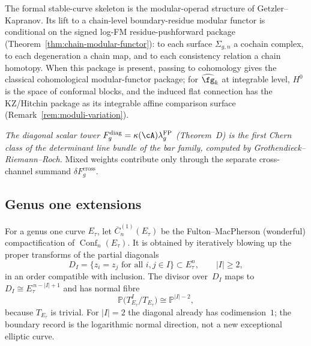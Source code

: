 The formal stable-curve skeleton is the modular-operad structure of
Getzler--Kapranov.  Its lift to a chain-level boundary-residue modular
functor is conditional on the signed log-FM residue-pushforward package
(Theorem~\ref{thm:chain-modular-functor}): to each surface
$\Sigma_{g,n}$ a cochain complex, to each degeneration a chain map, and
to each consistency relation a chain homotopy. When this package is
present, passing to cohomology gives the classical cohomological
modular-functor package; for $\widehat{\fg}_k$ at integrable level,
$H^0$ is the space of conformal blocks, and the induced flat
connection has the KZ/Hitchin package as its integrable affine
comparison surface
(Remark~\ref{rem:moduli-variation}).

\emph{The diagonal scalar tower
$F_g^{\mathrm{diag}} = \kappa(\cA)\lambda_g^{\mathrm{FP}}$
\textup{(}Theorem~D\textup{)}
is the first Chern class of the determinant line bundle of the
bar family, computed by Grothendieck--Riemann--Roch.}  Mixed
weights contribute only through the separate cross-channel summand
$\delta F_g^{\mathrm{cross}}$.

\subsection{Genus one extensions}\label{subsec:elliptic}

\begin{definition}\label{def:elliptic-config}
For a genus one curve $E_\tau$, let
$\overline{C}_n^{(1)}(E_\tau)$ be the Fulton--MacPherson
\textup{(}wonderful\textup{)} compactification of
$\operatorname{Conf}_n(E_\tau)$. It is obtained by iteratively blowing
up the proper transforms of the partial diagonals
\[
D_I=\{z_i=z_j\text{ for all }i,j\in I\}\subset E_\tau^n,
\qquad |I|\geq2,
\]
in an order compatible with inclusion. The divisor over~$D_I$ maps to
$D_I\cong E_\tau^{\,n-|I|+1}$ and has normal fibre
\[
\mathbb P\bigl(T_{E_\tau}^{I}/T_{E_\tau}\bigr)
\cong \mathbb P^{|I|-2},
\]
because $T_{E_\tau}$ is trivial. For $|I|=2$ the diagonal already has
codimension~$1$; the boundary record is the logarithmic normal
direction, not a new exceptional elliptic curve.
\end{definition}

